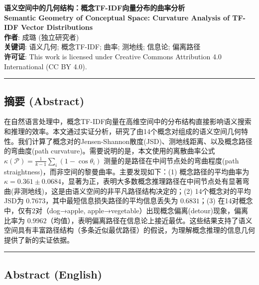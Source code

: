 \documentclass[
 UTF8,
 fontset=mac,
]{ctexart}
\author{成璐 (独立研究者)}
\date{}
\begin{document}
\begin{center}
{\LARGE\textbf{语义空间中的几何结构：概念TF-IDF向量分布的曲率分析}}\\[1em]
\textbf{\large Semantic Geometry of Conceptual Space: Curvature Analysis of TF-IDF Vector Distributions}\\[0.5em]
\textbf{作者}: 成璐 (独立研究者)\\[0.5em]
\textbf{关键词}: 语义几何; 概念TF-IDF; 曲率; 测地线; 信息论; 偏离路径\\[1em]
\textbf{许可证}: This work is licensed under Creative Commons Attribution 4.0 International (CC BY 4.0).
\end{center}

\begin{center}\rule{0.5\linewidth}{0.5pt}\end{center}

\subsection{摘要 (Abstract)}\label{abstract}

在自然语言处理中，概念TF-IDF向量在高维空间中的分布结构直接影响语义搜索和推理的效率。本文通过实证分析，研究了由14个概念对组成的语义空间几何特性。我们计算了概念对的Jensen-Shannon散度(JSD)、测地线距离、以及概念路径的弯曲度(path curvature)。需要说明的是，本文使用的离散曲率公式 $\kappa(\mathcal{P}) = \frac{1}{k-1}\sum_i(1-\cos\theta_i)$ 测量的是路径在中间节点处的弯曲程度(path straightness)，而非空间的黎曼曲率。主要发现如下：(1) 概念路径的平均曲率为 $\kappa = 0.361 \pm 0.0684$，显著为正，表明大多数概念推理路径在中间节点处有显著弯曲(非测地线)，这是由语义空间的非平凡路径结构决定的；(2) 14个概念对的平均JSD为 $0.7673$，其中最短信息损失路径的平均信息丢失为 $0.6831$；(3) 在14对概念中，仅有2对（dog→apple, apple→vegetable）出现概念偏离(detour)现象，偏离比率为 $0.9962$（均值），表明偏离路径在信息论上接近最优。这些结果支持了语义空间具有丰富路径结构（多条近似最优路径）的假说，为理解概念推理的信息几何提供了新的实证依据。

\begin{center}\rule{0.5\linewidth}{0.5pt}\end{center}

\subsection*{Abstract (English)}
\end{document}

